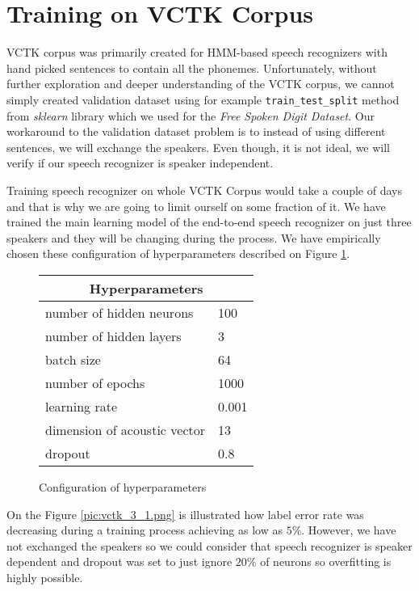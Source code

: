
\section{Training on VCTK Corpus}

VCTK corpus was primarily created for HMM-based speech recognizers with hand picked sentences to contain all the phonemes.
Unfortunately, without further exploration and deeper understanding of the VCTK corpus, we cannot simply created validation dataset using for example \texttt{train\_test\_split} method from \textit{sklearn} library which we used for the \textit{Free Spoken Digit Dataset}.
Our workaround to the validation dataset problem is to instead of using different sentences, we will exchange the speakers.
Even though, it is not ideal, we will verify if our speech recognizer is speaker independent.

Training speech recognizer on whole VCTK Corpus would take a couple of days and that is why we are going to limit ourself on some fraction of it.
We have trained the main learning model of the end-to-end speech recognizer on just three speakers and they will be changing during the process.
We have empirically chosen these configuration of hyperparameters described on Figure \ref{conf3}.

\begin{figure}
	\centering
	\begin{tabular}{ |l|l| }
  	\hline
  	\multicolumn{2}{|c|}{Hyperparameters} \\
  	\hline
  	number of hidden neurons & 100 \\
  	number of hidden layers & 3 \\
  	batch size & 64 \\
  	number of epochs & 1000 \\
  	learning rate & 0.001 \\
  	dimension of acoustic vector & 13 \\
  	dropout & 0.8 \\
  	\hline
	\end{tabular}
	\caption{Configuration of hyperparameters} \label{conf3}
\end{figure}

On the Figure \ref{pic:vctk_3_1.png} is illustrated how label error rate was decreasing during a training process achieving as low as $5\%$.
However, we have not exchanged the speakers so we could consider that speech recognizer is speaker dependent and dropout was set to just ignore $20\%$ of neurons so overfitting is highly possible.

